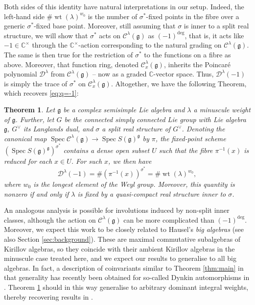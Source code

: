 \documentclass{amsart}
\newcommand{\C}{\mathbb{C}}
\newcommand{\Kir}{\mathcal{C}}
\newcommand{\D}{\mathcal{D}}
\newcommand{\g}{\mathfrak{g}}
\newcommand{\Spec}{\operatorname{Spec}}
\newcommand{\wt}{\operatorname{wt}}
\newcommand{\inv}{^{-1}}
\theoremstyle{definition}
\theoremstyle{plain}
\newtheorem{thm}[defn]{Theorem}
\theoremstyle{remark}
\begin{document}
Both sides of this identity have natural interpretations in our setup. Indeed, the left-hand side $\#\wt(\lambda)^{w_0}$ is the number of $\sigma^*$-fixed points in the fibre over a generic $\sigma^*$-fixed base point. Moreover, still assuming that $\sigma$ is inner to a split real structure, we will show that $\sigma^*$ 
acts on $\Kir^\lambda(\g)$ as $(-1)^{\deg}$, that is, it acts like $-1\in \C^\times$ through the $\C^\times$-action corresponding to the natural grading on $\Kir^\lambda(\g)$. The same is then true for the restriction of $\sigma^*$ to the functions on a fibre as above. Moreover, that function ring, denoted $\Kir^\lambda_x(\g)$, inherits the Poincaré polynomial $\D^\lambda$ from $\Kir^\lambda(\g)$ -- now as a graded $\C$-vector space. Thus, $\D^\lambda(-1)$ is simply the trace of $\sigma^*$ on $\Kir^\lambda_x(\g)$. Altogether, we have the following Theorem, which recovers \eqref{eq:q=-1}: 
\begin{thm}
\label{thm:fixed_point_count}
    Let $\g$ be a complex semisimple Lie algebra and $\lambda$ a minuscule weight of $\g$. Further, let $G$ be the connected simply connected Lie group with Lie algebra $\g$, $G^\vee$ its Langlands dual, and $\sigma$ a split real structure of $G^\vee$. Denoting the canonical map $\Spec \Kir^\lambda(\g)\to \Spec S(\g)^\g$ by $\pi$, the fixed-point scheme $(\Spec S(\g)^\g)^{\sigma^*}$ contains a dense open subset $U$ such that the fibre $\pi\inv(x)$ is reduced for each $x\in U$. For such $x$, we then have
    $$
        \D^\lambda(-1)
        =
        \#(\pi\inv(x))^{\sigma^*}
        =
        \#\wt(\lambda)^{w_0},
    $$
    where $w_0$ is the longest element of the Weyl group. Moreover, this quantity is nonzero if and only if $\lambda$ is fixed by a quasi-compact real structure inner to $\sigma$.
\end{thm}

An analogous analysis is possible for involutions induced by non-split inner classes, although the action on $\Kir^\lambda(\g)$ can be more complicated than $(-1)^{\deg}$. Moreover, we expect this work to be closely related to Hausel's \emph{big algebras} \cite{Hausel2024_avatars} (see also Section \ref{sec:background}). These are maximal commutative subalgebras of Kirillov algebras, so they coincide with their ambient Kirillov algebras in the minuscule case treated here, and we expect our results to generalise to all big algebras. In fact, a description of coinvariants similar to Theorem \ref{thm:main} in that generality has recently been obtained for so-called Dynkin automorphisms in \cite{Zveryk2024_dynkin}. Theorem \ref{thm:fixed_point_count} should in this way generalise to arbitrary dominant integral weights, thereby recovering results in \cite{Stembridge1996_canonical}. 
\end{document}
